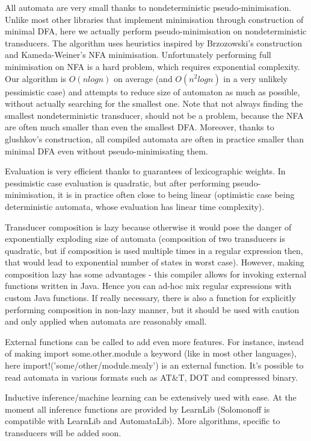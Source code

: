 \documentclass[oneside,polski,logo]{amuthesis}
\begin{document}
\begin{streszczenie}
All automata are very small thanks to nondeterministic pseudo-minimisation. Unlike most other libraries that implement minimisation through construction of minimal DFA, here we actually perform pseudo-minimisation on nondeterministic transducers. The algorithm uses heuristics inspired by Brzozowski's construction and Kameda-Weiner's NFA minimisation. Unfortunately performing full minimisation on NFA is a hard problem, which requires exponential complexity. Our algorithm is $O(n log n)$ on average (and $O(n^2 log n)$ in a very unlikely pessimistic case) and attempts to reduce size of automaton as much as possible, without actually searching for the smallest one. Note that not always finding the smallest nondeterministic transducer, should not be a problem, because the NFA are often much smaller than even the smallest DFA. Moreover, thanks to glushkov's construction, all compiled automata are often in practice smaller than minimal DFA even without pseudo-minimisating them.

Evaluation is very efficient thanks to guarantees of lexicographic weights. In pessimistic case evaluation is quadratic, but after performing pseudo-minimisation, it is in practice often close to being linear (optimistic case being deterministic automata, whose evaluation has linear time complexity).

Transducer composition is lazy because otherwise it would pose the danger of exponentially exploding size of automata (composition of two transducers is quadratic, but if composition is used multiple times in a regular expression then, that would lead to exponential number of states in worst case). However, making composition lazy has some advantages - this compiler allows for invoking external functions written in Java. Hence you can ad-hoc mix regular expressions with custom Java functions. If really necessary, there is also a function for explicitly performing composition in non-lazy manner, but it should be used with caution and only applied when automata are reasonably small.

External functions can be called to add even more features. For instance, instead of making import some.other.module a keyword (like in most other languages), here import!('some/other/module.mealy') is an external function. It's possible to read automata in various formats such as AT&T, DOT and compressed binary.


Inductive inference/machine learning can be extensively used with ease. At the moment all inference functions are provided by LearnLib (Solomonoff is compatible with LearnLib and AutomataLib). More algorithms, specific to transducers will be added soon.


\end{streszczenie}
\end{document}
